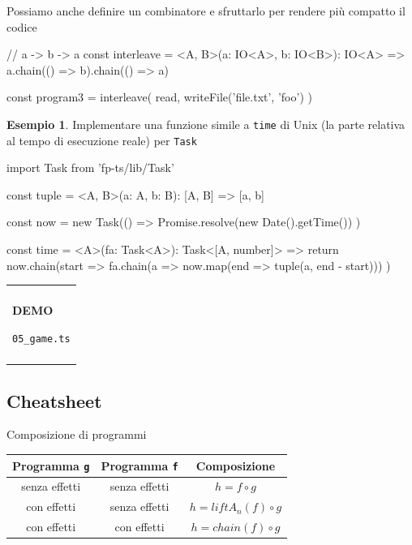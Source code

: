 \documentclass[12pt]{article}
\theoremstyle{definition}
\newtheorem{example}{Esempio}[section]
\newenvironment{demo}
    {\begin{center}
    \begin{tabular}{|p{0.9\textwidth}|}
    \hline\\
    }
    {
    \\\\\hline
    \end{tabular}
    \end{center}
    }
\newenvironment{code}
  {\vspace{0.5cm} \VerbatimEnvironment\begin{typescriptcode}}
  {\end{typescriptcode} \vspace{0.2cm}}
\begin{document}
Possiamo anche definire un combinatore e sfruttarlo per rendere più compatto il codice

\begin{code}
// a -> b -> a
const interleave = <A, B>(a: IO<A>, b: IO<B>): IO<A> =>
  a.chain(() => b).chain(() => a)

const program3 = interleave(
  read,
  writeFile('file.txt', 'foo')
)
\end{code}

\begin{example}
Implementare una funzione simile a \texttt{time} di Unix (la parte relativa al tempo di esecuzione reale) per \texttt{Task}

\begin{code}
import { Task } from 'fp-ts/lib/Task'

const tuple = <A, B>(a: A, b: B): [A, B] => [a, b]

const now = new Task(() =>
  Promise.resolve(new Date().getTime())
)

const time = <A>(fa: Task<A>): Task<[A, number]> => {
  return now.chain(start =>
    fa.chain(a => now.map(end => tuple(a, end - start)))
  )
}
\end{code}
\end{example}

\begin{demo}
\begin{center}
\textbf{DEMO}

\texttt{05\_game.ts}
\end{center}
\end{demo}

\newpage
\subsection{Cheatsheet}

Composizione di programmi

\begin{center}
\bgroup
\def\arraystretch{1.5}
\begin{tabular}{ |c|c|c| }
\hline
Programma \texttt{g} & Programma \texttt{f} & Composizione \\
\hline
senza effetti & senza effetti & $h = f \circ g$ \\
\hline
con effetti & senza effetti & $h = liftA_n(f) \circ g$ \\
\hline
con effetti & con effetti & $h = chain(f) \circ g$ \\
\hline
\end{tabular}
\egroup
\end{center}
\end{document}
